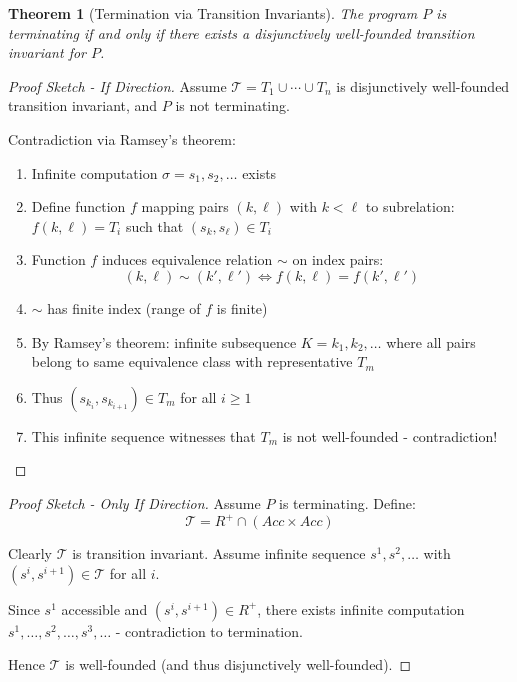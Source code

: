 \documentclass{article}
\newtheorem{theorem}{Theorem}
\begin{document}
\begin{theorem}[Termination via Transition Invariants]
\label{thm:termination}
The program $P$ is terminating if and only if there exists a disjunctively well-founded transition invariant for $P$.
\end{theorem}

\begin{proof}[Proof Sketch - If Direction]
Assume $\mathcal{T} = T_1 \cup \cdots \cup T_n$ is disjunctively well-founded transition invariant, and $P$ is not terminating.

Contradiction via Ramsey's theorem:
\begin{enumerate}
    \item Infinite computation $\sigma = s_1, s_2, \ldots$ exists

    \item Define function $f$ mapping pairs $(k, \ell)$ with $k < \ell$ to subrelation: $f(k, \ell) = T_i$ such that $(s_k, s_\ell) \in T_i$

    \item Function $f$ induces equivalence relation $\sim$ on index pairs:
    \begin{equation}
    (k, \ell) \sim (k', \ell') \iff f(k, \ell) = f(k', \ell')
    \end{equation}

    \item $\sim$ has finite index (range of $f$ is finite)

    \item By Ramsey's theorem: infinite subsequence $K = k_1, k_2, \ldots$ where all pairs belong to same equivalence class with representative $T_m$

    \item Thus $(s_{k_i}, s_{k_{i+1}}) \in T_m$ for all $i \geq 1$

    \item This infinite sequence witnesses that $T_m$ is not well-founded - contradiction!
\end{enumerate}
\end{proof}

\begin{proof}[Proof Sketch - Only If Direction]
Assume $P$ is terminating. Define:
\begin{equation}
\mathcal{T} = R^+ \cap (Acc \times Acc)
\end{equation}

Clearly $\mathcal{T}$ is transition invariant. Assume infinite sequence $s^1, s^2, \ldots$ with $(s^i, s^{i+1}) \in \mathcal{T}$ for all $i$.

Since $s^1$ accessible and $(s^i, s^{i+1}) \in R^+$, there exists infinite computation $s^1, \ldots, s^2, \ldots, s^3, \ldots$ - contradiction to termination.

Hence $\mathcal{T}$ is well-founded (and thus disjunctively well-founded).
\end{proof}
\end{document}
